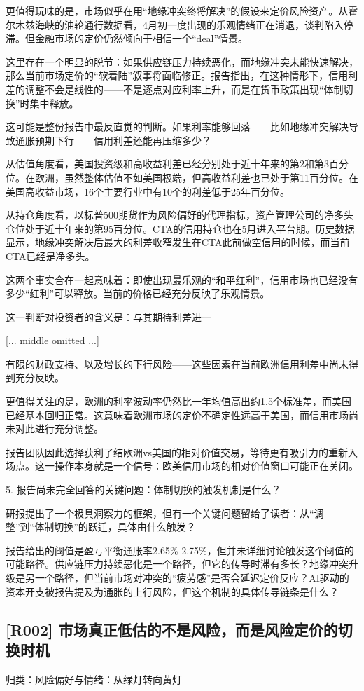 \documentclass[11pt]{ctexart}
\begin{document}
更值得玩味的是，市场似乎在用“地缘冲突终将解决”的假设来定价风险资产。从霍尔木兹海峡的油轮通行数据看，4月初一度出现的乐观情绪正在消退，谈判陷入停滞。但金融市场的定价仍然倾向于相信一个“deal”情景。

这里存在一个明显的脱节：如果供应链压力持续恶化，而地缘冲突未能快速解决，那么当前市场定价的“软着陆”叙事将面临修正。报告指出，在这种情形下，信用利差的调整不会是线性的——不是逐点对应利率上升，而是在货币政策出现“体制切换”时集中释放。

这可能是整份报告中最反直觉的判断。如果利率能够回落——比如地缘冲突解决导致通胀预期下行——信用利差还能再压缩多少？

从估值角度看，美国投资级和高收益利差已经分别处于近十年来的第2和第3百分位。在欧洲，虽然整体估值不如美国极端，但高收益利差也已处于第11百分位。在美国高收益市场，16个主要行业中有10个的利差低于25年百分位。

从持仓角度看，以标普500期货作为风险偏好的代理指标，资产管理公司的净多头仓位处于近十年来的第95百分位。CTA的信用持仓也在5月进入平台期。历史数据显示，地缘冲突解决后最大的利差收窄发生在CTA此前做空信用的时候，而当前CTA已经是净多头。

这两个事实合在一起意味着：即使出现最乐观的“和平红利”，信用市场也已经没有多少“红利”可以释放。当前的价格已经充分反映了乐观情景。

这一判断对投资者的含义是：与其期待利差进一

[... middle omitted ...]

有限的财政支持、以及增长的下行风险——这些因素在当前欧洲信用利差中尚未得到充分反映。

更值得关注的是，欧洲的利率波动率仍然比一年均值高出约1.5个标准差，而美国已经基本回归正常。这意味着欧洲市场的定价不确定性远高于美国，而信用市场尚未对此进行充分调整。

报告团队因此选择获利了结欧洲vs美国的相对价值交易，等待更有吸引力的重新入场点。这一操作本身就是一个信号：欧美信用市场的相对价值窗口可能正在关闭。

5. 报告尚未完全回答的关键问题：体制切换的触发机制是什么？

研报提出了一个极具洞察力的框架，但有一个关键问题留给了读者：从“调整”到“体制切换”的跃迁，具体由什么触发？

报告给出的阈值是盈亏平衡通胀率2.65\%-2.75\%，但并未详细讨论触发这个阈值的可能路径。供应链压力持续恶化是一个路径，但它的传导时滞有多长？地缘冲突升级是另一个路径，但当前市场对冲突的“疲劳感”是否会延迟定价反应？AI驱动的资本开支被报告提及为通胀的上行风险，但这个机制的具体传导链条是什么？

\subsection{[R002] 市场真正低估的不是风险，而是风险定价的切换时机}
{\small\color{refgray}归类：风险偏好与情绪：从绿灯转向黄灯}
\end{document}
